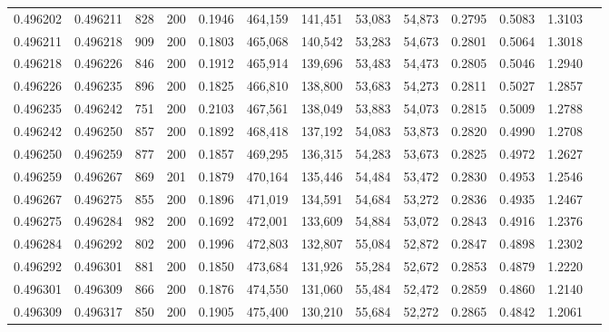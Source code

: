 \begin{tabular}{rrrrrrrrrrrrr}
0.496202 & 0.496211 &   828 & 200 &                                     0.1946 & 464,159 & 141,451 &  53,083 &  54,873 & 0.2795 & 0.5083 & 1.3103 \\
0.496211 & 0.496218 &   909 & 200 &                                     0.1803 & 465,068 & 140,542 &  53,283 &  54,673 & 0.2801 & 0.5064 & 1.3018 \\
0.496218 & 0.496226 &   846 & 200 &                                     0.1912 & 465,914 & 139,696 &  53,483 &  54,473 & 0.2805 & 0.5046 & 1.2940 \\
0.496226 & 0.496235 &   896 & 200 &                                     0.1825 & 466,810 & 138,800 &  53,683 &  54,273 & 0.2811 & 0.5027 & 1.2857 \\
0.496235 & 0.496242 &   751 & 200 &                                     0.2103 & 467,561 & 138,049 &  53,883 &  54,073 & 0.2815 & 0.5009 & 1.2788 \\
0.496242 & 0.496250 &   857 & 200 &                                     0.1892 & 468,418 & 137,192 &  54,083 &  53,873 & 0.2820 & 0.4990 & 1.2708 \\
0.496250 & 0.496259 &   877 & 200 &                                     0.1857 & 469,295 & 136,315 &  54,283 &  53,673 & 0.2825 & 0.4972 & 1.2627 \\
0.496259 & 0.496267 &   869 & 201 &                                     0.1879 & 470,164 & 135,446 &  54,484 &  53,472 & 0.2830 & 0.4953 & 1.2546 \\
0.496267 & 0.496275 &   855 & 200 &                                     0.1896 & 471,019 & 134,591 &  54,684 &  53,272 & 0.2836 & 0.4935 & 1.2467 \\
0.496275 & 0.496284 &   982 & 200 &                                     0.1692 & 472,001 & 133,609 &  54,884 &  53,072 & 0.2843 & 0.4916 & 1.2376 \\
0.496284 & 0.496292 &   802 & 200 &                                     0.1996 & 472,803 & 132,807 &  55,084 &  52,872 & 0.2847 & 0.4898 & 1.2302 \\
0.496292 & 0.496301 &   881 & 200 &                                     0.1850 & 473,684 & 131,926 &  55,284 &  52,672 & 0.2853 & 0.4879 & 1.2220 \\
0.496301 & 0.496309 &   866 & 200 &                                     0.1876 & 474,550 & 131,060 &  55,484 &  52,472 & 0.2859 & 0.4860 & 1.2140 \\
0.496309 & 0.496317 &   850 & 200 &                                     0.1905 & 475,400 & 130,210 &  55,684 &  52,272 & 0.2865 & 0.4842 & 1.2061 \\

\end{tabular}
